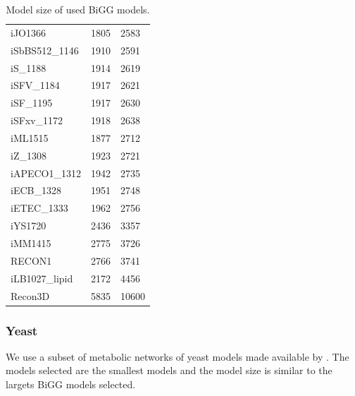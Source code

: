 \begin{table}[!ht]
\begin{tabular}{lll}
        iJO1366 & 1805 & 2583 \\ 
        iSbBS512\_1146 & 1910 & 2591 \\ 
        iS\_1188 & 1914 & 2619 \\ 
        iSFV\_1184 & 1917 & 2621 \\ 
        iSF\_1195 & 1917 & 2630 \\ 
        iSFxv\_1172 & 1918 & 2638 \\ 
        iML1515 & 1877 & 2712 \\ 
        iZ\_1308 & 1923 & 2721 \\ 
        iAPECO1\_1312 & 1942 & 2735 \\ 
        iECB\_1328 & 1951 & 2748 \\ 
        iETEC\_1333 & 1962 & 2756 \\ 
        iYS1720 & 2436 & 3357 \\ 
        iMM1415 & 2775 & 3726 \\ 
        RECON1 & 2766 & 3741 \\ 
        iLB1027\_lipid & 2172 & 4456 \\ 
        Recon3D & 5835 & 10600 \\ \hline
    \end{tabular}
    \caption{\label{Tab:big_model_size} Model size of used BiGG models.}
\end{table}

\subsubsection{Yeast} \label{section:methods_yeast}
We use a subset of metabolic networks of yeast models made available by \cite{lu_yeast_2021}. The models selected are the smallest models and the model size is similar to the largets BiGG models selected.

